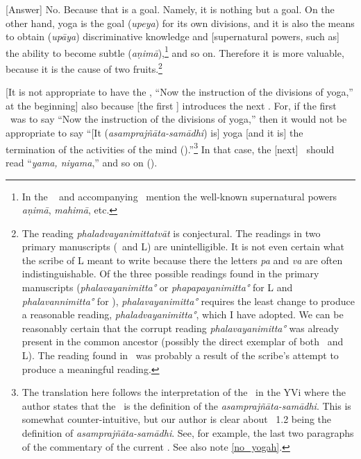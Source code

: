 [Answer] No.%
 Because that is a goal.  Namely, it is nothing but
a goal.  On the other hand, yoga is the goal (\emph{upeya}) for its own divisions, and it is also the means to obtain (\emph{upāya}) discriminative knowledge and [supernatural powers, such as] the ability to become subtle (\emph{aṇimā}),\footnote{In the \PYS\  and accompanying \bhasya\ mention the well-known supernatural powers \emph{aṇimā}, \emph{mahimā}, etc.} and so on.  Therefore it is more valuable, because it is the cause of two fruits.\footnote{The reading \emph{phaladvayanimittatvāt} is conjectural.  The readings in two primary manu\-scripts (\Tm\ and L) are unintelligible.  It is not even certain what the scribe of L meant to write because there the letters \emph{pa} and \emph{va} are often indistinguishable.  Of the three possible readings found in the primary manuscripts (\emph{phalavayanimitta°} or \emph{phapapayanimitta°} for L and \emph{phalavannimitta°} for \Tm), \emph{phalavayanimitta°} requires the least change to produce a reasonable reading, \emph{phaladvayanimitta°}, which I have adopted.  We can be reasonably certain that the corrupt reading \emph{phalavayanimitta°} was already present in the common ancestor (possibly the direct exemplar of both \Tm\ and L).  The reading found in \Tm\ was probably a result of the scribe's attempt to produce a meaningful reading.}

[It is not appropriate to have the
\sutra, ``Now the instruction of the divisions of yoga,'' at the
beginning]%
 also because [the first \sutra] introduces the next \sutra.
For, if the first \sutra\ was to say ``Now the instruction of the
divisions of yoga,'' then it would not be appropriate to say
``[It (\emph{asamprajñāta-samādhi}) is] yoga [and it is] the termination of the activities of the mind ().''\footnote{\label{YS12first}The translation here follows the interpretation of the \sutra\ in the YVi where the author states that the \sutra\ is the definition of the \emph{asamprajñāta-samādhi}.  This is somewhat counter-intuitive, but our author is clear about \sutra\ 1.2 being the definition of \emph{asamprajñāta-samādhi}.  See, for example, the last two paragraphs of the commentary of the current \sutra.  See also note \ref{no_yogah}.}
In that case, the [next] \sutra\ should read ``\emph{yama, niyama},''
and so on ().

